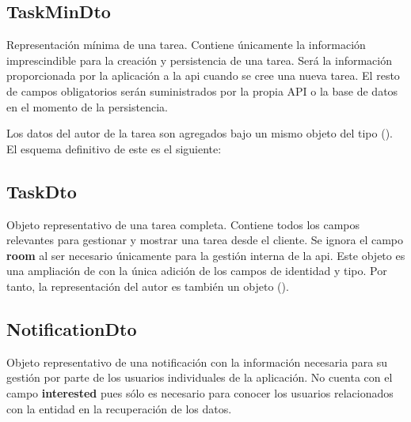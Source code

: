 \subsection{TaskMinDto}
\label{dto:taskmin}

Representación mínima de una tarea. Contiene únicamente la información imprescindible para la creación y persistencia de una tarea. Será la información proporcionada por la aplicación a la \acrshort{api} cuando se cree una nueva tarea. El resto de campos obligatorios serán suministrados por la propia API o la base de datos en el momento de la persistencia.

Los datos del autor de la tarea son agregados bajo un mismo objeto del tipo  (). El esquema definitivo de este es el siguiente:



\subsection{TaskDto}
\label{dto:taskmessage}

Objeto representativo de una tarea completa. Contiene todos los campos relevantes para gestionar y mostrar una tarea desde el cliente. Se ignora el campo \textbf{room} al ser necesario únicamente para la gestión interna de la \acrshort{api}. Este objeto es una ampliación de  con la única adición de los campos de identidad y tipo. Por tanto, la representación del autor es también un objeto  ().



\subsection{NotificationDto}
\label{dto:notification}

Objeto representativo de una notificación con la información necesaria para su gestión por parte de los usuarios individuales de la aplicación. No cuenta con el campo \textbf{interested} pues sólo es necesario para conocer los usuarios relacionados con la entidad en la recuperación de los datos.



